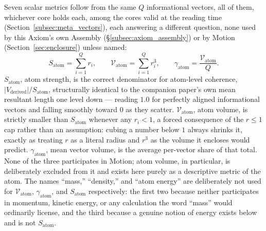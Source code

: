 \documentclass[12pt, a4paper]{article}
\begin{document}
Seven scalar metrics follow from the same $Q$ informational vectors, all of them, whichever core holds each, among the cores valid at the reading time (Section~\ref{subsec:meta_vectors}),
each answering a different question, none used by this Axiom's own
Assembly (\S\ref{subsec:axiom_assembly}) or by Motion
(Section~\ref{sec:enclosure}) unless named:
\[
S_{\text{atom}} = \sum_{i=1}^Q r_i, \qquad
\mathcal{V}_{\text{atom}} = \sum_{i=1}^Q r_i^3, \qquad
\gamma_{\text{atom}} = \frac{\mathcal{V}_{\text{atom}}}{Q}.
\]
$S_{\text{atom}}$, atom strength, is the correct denominator for
atom-level coherence, $\lvert V_{\text{derived}}\rvert /
S_{\text{atom}}$, structurally identical to the companion paper's own
mean resultant length one level down --- reading $1.0$ for perfectly
aligned informational vectors and falling smoothly toward $0$ as they
scatter. $\mathcal{V}_{\text{atom}}$, atom volume, is strictly
smaller than $S_{\text{atom}}$ whenever any $r_i<1$, a forced
consequence of the $r\le 1$ cap rather than an assumption: cubing a
number below $1$ always shrinks it, exactly as treating $r$ as a
literal radius and $r^3$ as the volume it encloses would predict.
$\gamma_{\text{atom}}$, mean vector volume, is the average per-vector
share of that total. None of the three participates in Motion; atom
volume, in particular, is deliberately excluded from it and exists
here purely as a descriptive metric of the atom. The names ``mass,''
``density,'' and ``atom energy'' are deliberately not used for
$\mathcal{V}_{\text{atom}}$, $\gamma_{\text{atom}}$, and
$S_{\text{atom}}$ respectively: the first two because neither
participates in momentum, kinetic energy, or any calculation the word
``mass'' would ordinarily license, and the third because a genuine
notion of energy exists below and is not $S_{\text{atom}}$.
\end{document}
